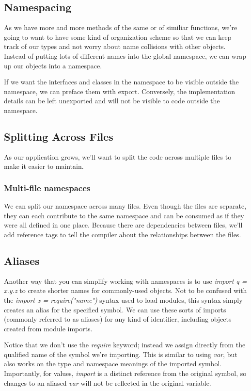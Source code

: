 \documentclass[a4paper]{report}
\begin{document}
\subsection{Namespacing}
As we have more and more methods of the same or of similiar functions, we're going to want to have some kind of organization scheme so that we can keep track of our types and not worry about name collisions with other objects. Instead of putting lots of different names into the global namespace, we can wrap up our objects into a namespace.
\par
If we want the interfaces and classes in the namespace to be visible outside the namespace, we can preface them with export. Conversely, the implementation details can be left unexported and will not be visible to code outside the namespace. 
\subsection{Splitting Across Files}
As our application grows, we’ll want to split the code across multiple files to make it easier to maintain.
\subsubsection{Multi-file namespaces}
We can split our namespace across many files. Even though the files are separate, they can each contribute to the same namespace and can be consumed as if they were all defined in one place. Because there are dependencies between files, we’ll add reference tags to tell the compiler about the relationships between the files.
\subsection{Aliases}
Another way that you can simplify working with namespaces is to use \emph{import q = x.y.z} to create shorter names for commonly-used objects. Not to be confused with the \emph{import x = require("name")} syntax used to load modules, this syntax simply creates an alias for the specified symbol. We can use these sorts of imports (commonly referred to as aliases) for any kind of identifier, including objects created from module imports.
\par
Notice that we don’t use the \emph{require} keyword; instead we assign directly from the qualified name of the symbol we’re importing. This is similar to using \emph{var}, but also works on the type and namespace meanings of the imported symbol. Importantly, for values, \emph{import} is a distinct reference from the original symbol, so changes to an aliased \emph{var} will not be reflected in the original variable.
\end{document}
